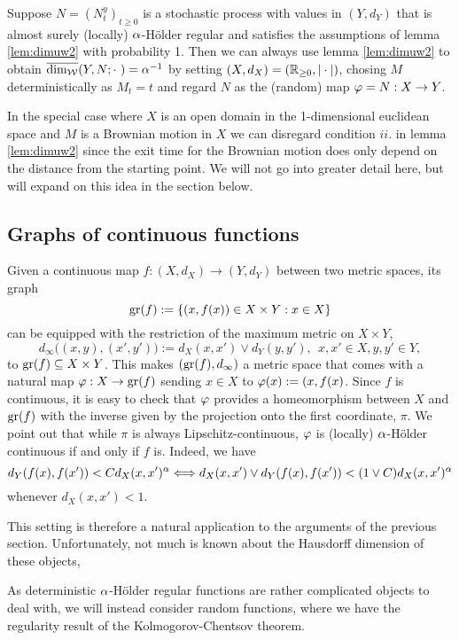 \begin{rem} 
  Suppose $N=\left(N_t^y\right)_{t\geq0}$ is a stochastic process with values in $(Y,d_Y)$ that is almost surely (locally) $\alpha$-H\"older regular and satisfies the assumptions of lemma \ref{lem:dimuw2} with probability 1. Then we can always use lemma \ref{lem:dimuw2} to obtain
  $\overline{\dim_{\mathcal{W}}}(Y,N;\cdot\ )=\alpha^{-1}$ by setting 
  $(X,d_X)=(\mathbb{R}_{\geq0},|\cdot|)$, chosing $M$ deterministically as $M_t=t$ and regard $N$ as the (random) map $\varphi=N:X\to Y$.
\end{rem}
In the special case where $X$ is an open domain in the 1-dimensional euclidean space and $M$ is a Brownian motion in $X$ we can disregard condition $ii.$ in lemma \ref{lem:dimuw2} since the exit time for the Brownian motion does only depend on the distance from the starting point. We will not go into greater detail here, but will expand on this idea in the section below.



\subsection{Graphs of continuous functions}

Given a continuous map $f:(X,d_X)\to (Y,d_Y)$ between two metric spaces, its graph
\[
  \operatorname{gr}(f):=\left\{(x,f(x))\in X\times Y:x\in X\right\}
\]
can be equipped with the restriction of the maximum metric on 
$X\times Y$,
\[
  d_\infty\big((x,y),(x',y')\big):=d_X(x,x')\vee d_Y(y,y'),\ \ 
  x,x'\in X, y,y'\in Y,
\]
to $\operatorname{gr}(f)\subseteq X\times Y$. This makes $(\operatorname{gr}(f),d_\infty)$ a metric space that comes with a natural map $\varphi:X\to\operatorname{gr}(f)$ sending $x\in X$ to 
$\varphi(x):=(x,f(x)$. Since $f$ is continuous, it is easy to check that 
$\varphi$ provides a homeomorphism between $X$ and $\operatorname{gr}(f)$ with the inverse given by the projection onto the first coordinate, $\pi$.
We point out that while $\pi$ is always Lipschitz-continuous, $\varphi$ is 
(locally) $\alpha$-H\"older continuous if and only if $f$ is. Indeed, we have 
\[
  d_Y(f(x),f(x'))<Cd_X(x,x')^\alpha \Longleftrightarrow
  d_X(x,x')\vee d_Y(f(x),f(x'))<(1\vee C)d_X(x,x')^\alpha
\]  
whenever $d_X(x,x')<1$. 

This setting is therefore a natural application to the arguments of the previous section. Unfortunately, not much is known about the Hausdorff dimension of these objects, 

As deterministic $\alpha$-H\"older regular functions are rather complicated objects to deal with, we will instead consider random functions, where we have the regularity result of the Kolmogorov-Chentsov theorem.


